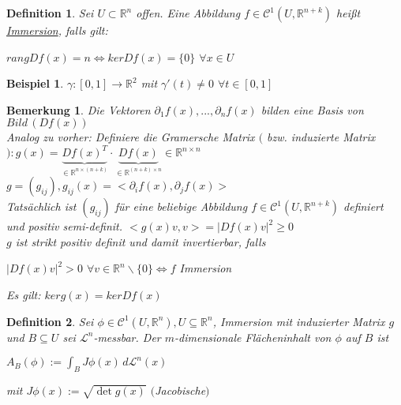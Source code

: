 \documentclass[11pt]{memoir}
\theoremstyle{changebreak}
\newtheorem{Definition}{Definition}[chapter]
\newtheorem{Bemerkung}{Bemerkung}[chapter]
\newtheorem{Beispiel}{Beispiel}[chapter]
\begin{document}
\begin{Definition}
Sei $U \subset \mathbb R^n$ offen. Eine Abbildung $f \in \mathscr C^1(U, \mathbb R^{n+k})$ heißt \underline{Immersion}, falls gilt:
\begin{center}
	$ rang D f(x) = n \Leftrightarrow ker D f(x) = \{0\}$ $\forall x \in U$
\end{center}
\end{Definition}

\begin{Beispiel}
$\gamma: [0, 1] \rightarrow \mathbb R^2$ mit $\gamma'(t) \ne 0$ $\forall t \in [0,1]$
\end{Beispiel}

\begin{Bemerkung}
Die Vektoren $\partial_1 f(x), ..., \partial_n f(x)$ bilden eine Basis von $Bild\,(Df(x))$ \\
Analog zu vorher: Definiere die Gramersche Matrix $($ bzw. induzierte Matrix$): g(x) = \underbrace{Df(x)^T}_{\in \mathbb R^{n \times (n+k)}}\cdotp \underbrace{Df(x)}_{\in \mathbb R^{(n+k) \times n}} \in \mathbb R^{n\times n}$ \\
$g= (g_{ij}), g_{ij}(x) = <\partial_i f(x), \partial_j f(x)>$ \\
Tatsächlich ist $(g_{ij})$ für eine beliebige Abbildung $f \in \mathscr C^1(U, \mathbb R^{n+k})$ definiert und positiv semi-definit. $<g(x)v, v> = |Df(x)v|^2 \geq 0$ \\
$g$ ist strikt positiv definit und damit invertierbar, falls
\begin{center}
	$|Df(x)v|^2 > 0$ $\forall v \in \mathbb R^n \backslash \{0\} \Leftrightarrow f$ Immersion
\end{center}
Es gilt: $ker g(x) = ker Df(x)$
\end{Bemerkung}

\begin{Definition}
Sei $\phi \in \mathscr C^1(U, \mathbb R^n), U \subseteq \mathbb R^n$, Immersion mit induzierter Matrix $g$ und $B \subseteq U$ sei $\mathscr L^n$-messbar. Der $m$-dimensionale Flächeninhalt von $\phi$ auf $B$ ist
\begin{center}
	$A_B(\phi) := \int_B J \phi(x) \, d \mathscr L^n(x)$
\end{center}
mit $J\phi(x) := \sqrt{\det g(x)}$ $($Jacobische$)$
\end{Definition}
\end{document}
